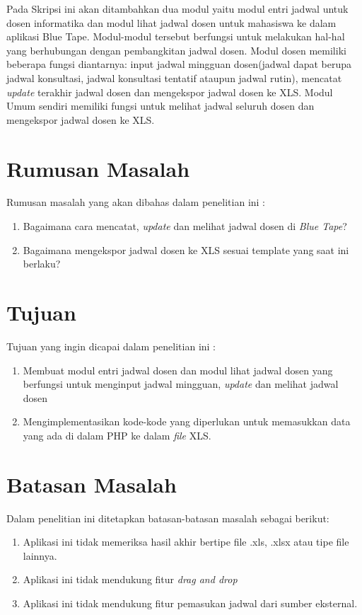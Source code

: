 
Pada Skripsi ini akan ditambahkan dua modul yaitu modul entri jadwal untuk dosen informatika dan modul lihat jadwal dosen untuk mahasiswa ke dalam aplikasi Blue Tape. Modul-modul tersebut berfungsi untuk melakukan hal-hal yang berhubungan dengan pembangkitan jadwal dosen. Modul dosen memiliki beberapa fungsi diantarnya: input jadwal mingguan dosen(jadwal dapat berupa jadwal konsultasi, jadwal konsultasi tentatif ataupun jadwal rutin), mencatat \textit{update} terakhir jadwal dosen dan mengekspor jadwal dosen ke XLS. Modul Umum sendiri memiliki fungsi untuk melihat jadwal seluruh dosen dan mengekspor jadwal dosen ke XLS.


\section{Rumusan Masalah}
\label{sec:rumusan}
Rumusan masalah yang akan dibahas dalam penelitian ini :
	\begin{enumerate}
		\item Bagaimana cara mencatat, \textit{update} dan melihat jadwal dosen di \textit{Blue Tape}?
		\item Bagaimana mengekspor jadwal dosen ke XLS sesuai template yang saat ini berlaku?
	\end{enumerate}


\section{Tujuan}
\label{sec:tujuan}
Tujuan yang ingin dicapai dalam penelitian ini : 
	\begin{enumerate}
		\item Membuat modul entri jadwal dosen dan modul lihat jadwal dosen yang berfungsi untuk menginput jadwal mingguan, \textit{update} dan melihat jadwal dosen
		\item Mengimplementasikan kode-kode yang diperlukan untuk memasukkan data yang ada di dalam PHP ke dalam \textit{file} XLS. 

	\end{enumerate}

\section{Batasan Masalah}
\label{sec:batasan}
Dalam penelitian ini ditetapkan batasan-batasan masalah sebagai berikut:
\begin{enumerate}
	\item Aplikasi ini tidak memeriksa hasil akhir bertipe file .xls, .xlsx atau tipe file lainnya.
	\item Aplikasi ini tidak mendukung fitur \textit{drag and drop}
	\item Aplikasi ini tidak mendukung fitur pemasukan jadwal dari sumber eksternal.
\end{enumerate}

